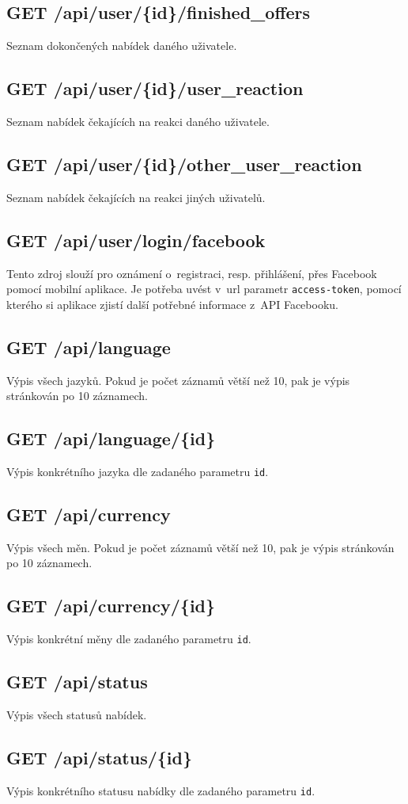 \subsection{GET /api/user/\{id\}/finished\_offers}
Seznam dokončených nabídek daného uživatele.

\subsection{GET /api/user/\{id\}/user\_reaction}
Seznam nabídek čekajících na reakci daného uživatele.

\subsection{GET /api/user/\{id\}/other\_user\_reaction}
Seznam nabídek čekajících na reakci jiných uživatelů.

\subsection{GET /api/user/login/facebook}
Tento zdroj slouží pro oznámení o~registraci, resp. přihlášení, přes Facebook pomocí mobilní aplikace. Je potřeba uvést v~url parametr \texttt{access-token}, pomocí kterého si aplikace zjistí další potřebné informace z~API Facebooku.

\subsection{GET /api/language}
Výpis všech jazyků. Pokud je počet záznamů větší než 10, pak je výpis stránkován po 10 záznamech.

\subsection{GET /api/language/\{id\}}
Výpis konkrétního jazyka dle zadaného parametru \texttt{id}.

\subsection{GET /api/currency}
Výpis všech měn. Pokud je počet záznamů větší než 10, pak je výpis stránkován po 10 záznamech.

\subsection{GET /api/currency/\{id\}}
Výpis konkrétní měny dle zadaného parametru \texttt{id}.

\subsection{GET /api/status}
Výpis všech statusů nabídek.

\subsection{GET /api/status/\{id\}}
Výpis konkrétního statusu nabídky dle zadaného parametru \texttt{id}.